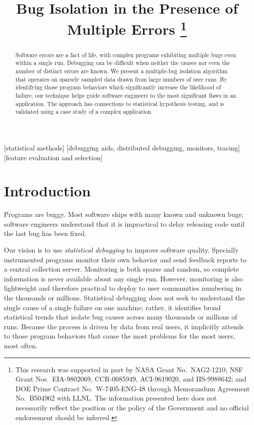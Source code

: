 \documentclass{sig-alternate}
\title{Bug Isolation in the Presence of Multiple Errors
  \thanks{This research was supported in part by NASA Grant No.\
    NAG2-1210; NSF Grant Nos.\ EIA-9802069, CCR-0085949, ACI-9619020,
    and IIS-9988642; and DOE Prime Contract No.\ W-7405-ENG-48 through
    Memorandum Agreement No.\ B504962 with LLNL.  The information
    presented here does not necessarily reflect the position or the
    policy of the Government and no official endorsement should be
    inferred.}}
\author{
  \alignauthor Ben Liblit \eecs \\
  \alignauthor Mayur Naik \stan \\
  \alignauthor Alice X.\ Zheng \eecs \\
  \moreauthors
  \global\multiply\auwidth by 3
  \global\divide\auwidth by 2
  \alignauthor Alex Aiken \stan \\
  \alignauthor Michael I.\ Jordan \both
  \moreauthors
  \alignauthor
  \affaddr{\eecs Department of Electrical \\ Engineering and Computer Science} \\
  \affaddr{\stat Department of Statistics} \\
  \affaddr{University of California, Berkeley} \\
  \affaddr{Berkeley, CA 94720-1776}
  \alignauthor
  \affaddr{\stan Computer Science Department} \\
  \affaddr{353 Serra Mall} \\
  \affaddr{Stanford University} \\
  \affaddr{Stanford CA 94305-9025}
}
\begin{document}
\CopyrightYear{2004}
\maketitle

\begin{abstract}
  Software errors are a fact of life, with complex programs exhibiting
  multiple bugs even within a single run.  Debugging can be difficult
  when neither the causes nor even the number of distinct errors are
  known.  We present a multiple-bug isolation algorithm that operates
  on sparsely sampled data drawn from large numbers of user runs.  By
  identifying those program behaviors which significantly increase the
  likelihood of failure, our technique helps guide software engineers
  to the most significant flaws in an application.  The approach has
  connections to statistical hypothesis testing, and is validated
  using a case study of a complex application.
\end{abstract}

[statistical methods]
[debugging aids, distributed debugging, monitors, tracing]
[feature
  evaluation and selection]




\section{Introduction}
\label{sec:introduction}

Programs are buggy.  
Most software ships with many known and unknown bugs; software
engineers understand that it is impractical to delay releasing code
until the last bug has been fixed.

Our vision is to use {\em statistical debugging} to
improve software quality.  Specially
instrumented programs monitor their own behavior and send feedback
reports to a central collection server.  Monitoring is both sparse and
random, so complete information is never available about
any single run.  However, monitoring is also lightweight and therefore
practical to deploy to user communities numbering in the thousands or
millions.  Statistical debugging does not seek to understand the
single cause of a single failure on one machine; rather, it identifies
broad statistical trends that isolate bug causes across many thousands
or millions of runs.  Because the process is driven by data from real
users, it implicitly attends to those program behaviors that cause the
most problems for the most users, most often.
\end{document}
